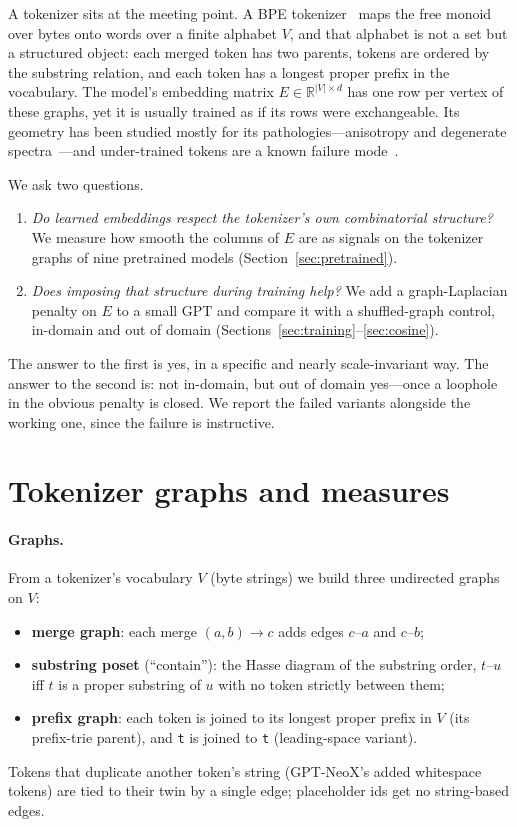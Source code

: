 \documentclass[11pt]{article}
\newcommand{\tok}[1]{\texttt{#1}}          %
\newcommand{\vsp}{\textvisiblespace}          %
\newcommand{\R}{\mathbb{R}}
\begin{document}
A tokenizer sits at the meeting point. A BPE tokenizer~\cite{sennrich2016} maps the
free monoid over bytes onto words over a finite alphabet $V$, and that alphabet is
not a set but a structured object: each merged token has two parents, tokens are
ordered by the substring relation, and each token has a longest proper prefix in
the vocabulary. The model's embedding matrix $E\in\R^{|V|\times d}$ has one row per
vertex of these graphs, yet it is usually trained as if its rows were exchangeable.
Its geometry has been studied mostly for its pathologies---anisotropy and
degenerate spectra~\cite{ethayarajh2019,gao2019}---and under-trained tokens are a
known failure mode~\cite{land2024}.

We ask two questions.
\begin{enumerate}
  \item \emph{Do learned embeddings respect the tokenizer's own combinatorial
  structure?} We measure how smooth the columns of $E$ are as signals on the
  tokenizer graphs of nine pretrained models (Section~\ref{sec:pretrained}).
  \item \emph{Does imposing that structure during training help?} We add a
  graph-Laplacian penalty on $E$ to a small GPT and compare it with a shuffled-graph
  control, in-domain and out of domain (Sections~\ref{sec:training}--\ref{sec:cosine}).
\end{enumerate}

The answer to the first is yes, in a specific and nearly scale-invariant way. The
answer to the second is: not in-domain, but out of domain yes---once a loophole in
the obvious penalty is closed. We report the failed variants alongside the working
one, since the failure is instructive.

\section{Tokenizer graphs and measures}\label{sec:method}

\paragraph{Graphs.} From a tokenizer's vocabulary $V$ (byte strings) we build three
undirected graphs on $V$:
\begin{itemize}
  \item \textbf{merge graph}: each merge $(a,b)\to c$ adds edges $c$--$a$ and
  $c$--$b$;
  \item \textbf{substring poset} (``contain''): the Hasse diagram of the substring
  order, $t$--$u$ iff $t$ is a proper substring of $u$ with no token strictly
  between them;
  \item \textbf{prefix graph}: each token is joined to its longest proper prefix in
  $V$ (its prefix-trie parent), and \tok{t} is joined to \tok{\vsp t}
  (leading-space variant).
\end{itemize}
Tokens that duplicate another token's string (GPT-NeoX's added whitespace tokens)
are tied to their twin by a single edge; placeholder ids get no string-based edges.
\end{document}
